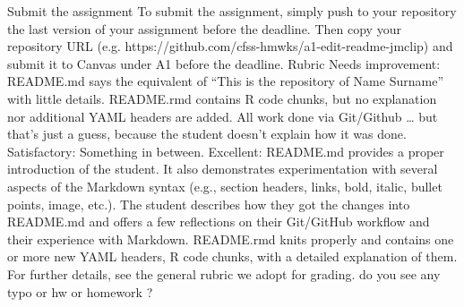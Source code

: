 \begin{userprompt}
Submit the assignment
To submit the assignment, simply push to your repository the last version of your assignment before the deadline. Then copy your repository URL (e.g. https://github.com/cfss-hmwks/a1-edit-readme-jmclip) and submit it to Canvas under A1 before the deadline.
Rubric
Needs improvement: README.md says the equivalent of “This is the repository of Name Surname” with little details. README.rmd contains R code chunks, but no explanation nor additional YAML headers are added. All work done via Git/Github … but that’s just a guess, because the student doesn’t explain how it was done.
Satisfactory: Something in between.
Excellent: README.md provides a proper introduction of the student. It also demonstrates experimentation with several aspects of the Markdown syntax (e.g., section headers, links, bold, italic, bullet points, image, etc.). The student describes how they got the changes into README.md and offers a few reflections on their Git/GitHub workflow and their experience with Markdown. README.rmd knits properly and contains one or more new YAML headers, R code chunks, with a detailed explanation of them.
For further details, see the general rubric we adopt for grading.
do you see any typo or hw or homework ?

\end{userprompt}

